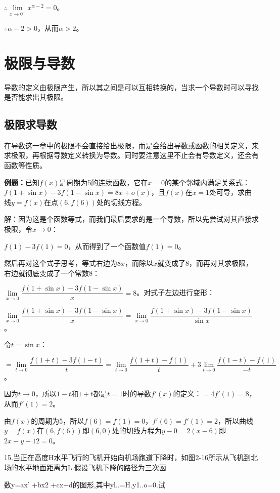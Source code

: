\documentclass[UTF8, 12pt]{ctexart}
\begin{document}
$\therefore\lim\limits_{x\to 0^+}x^{\alpha-2}=0$。

$\therefore\alpha-2>0$，从而$\alpha>2$。

\section{极限与导数}

导数的定义由极限产生，所以其之间是可以互相转换的，当求一个导数时可以寻找是否能求出其极限。

\subsection{极限求导数}

在导数这一章中的极限不会直接给出极限，而是会给出导数或函数的相关定义，来求极限，再根据导数定义转换为导数。同时要注意这里不止会有导数定义，还会有函数等性质。

\textbf{例题：}已知$f(x)$是周期为5的连续函数，它在$x=0$的某个邻域内满足关系式：$f(1+\sin x)-3f(1-\sin x)= 8x+o(x)$，且$f(x)$在$x=1$处可导，求曲线$y=f(x)$在点$(6,f(6))$处的切线方程。

解：因为这是个函数等式，而我们最后要求的是一个导数，所以先尝试对其直接求极限，令$x\to0$：

$f(1)-3f(1)=0$，从而得到了一个函数值$f(1)=0$。

然后再对这个式子思考，等式右边为$8x$，而除以$x$就变成了8，而再对其求极限，右边就彻底变成了一个常数8：

$\lim\limits_{x\to 0}\dfrac{f(1+\sin x)-3f(1-\sin x)}{x}=8$。对式子左边进行变形：

$\lim\limits_{x\to 0}\dfrac{f(1+\sin x)-3f(1-\sin x)}{x}=\lim\limits_{x\to 0}\dfrac{f(1+\sin x)-3f(1-\sin x)}{\sin x}$。

令$t=\sin x$：

$=\lim\limits_{t\to 0}\dfrac{f(1+t)-3f(1-t)}{t}=\lim\limits_{t\to 0}\dfrac{f(1+t)-f(1)}{t}+3\lim\limits_{t\to 0}\dfrac{f(1-t)-f(1)}{-t}$。

因为$t\to 0$，所以$1-t$和$1+t$都是$t=1$时的导数$f'(x)$的定义：$=4f'(1)=8$，从而$f'(1)=2$。

由$f(x)$的周期为5，所以$f(6)=f(1)=0$，$f'(6)=f'(1)=2$，所以曲线$y=f(x)$在$(6,f(6))$即$(6,0)$处的切线方程为$y-0=2(x-6)$即$2x-y-12=0$。

15.当正在高度H水平飞行的飞机开始向机场跑道下降时，如图2-16所示从飞机到北场的水平地面距离为L.假设飞机下降的路径为三次函

数y=ax' +bx2 +cx+d的图形,其中yl..=H.y1..o=0.试
\end{document}
